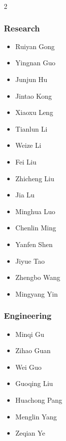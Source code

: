 \setlength{\parskip}{0pt} %
\setlength{\itemsep}{0pt} %
\setlength{\parsep}{0pt}  %
\begin{multicols}{2}
\raggedcolumns

\subsubsection*{Research}
\begin{itemize}
\item Ruiyan Gong
\item Yingnan Guo
\item Junjun Hu
\item Jintao Kong
\item Xiaoxu Leng
\item Tianlun Li
\item Weize Li
\item Fei Liu
\item Zhicheng Liu
\item Jia Lu
\item Minghua Luo
\item Chenlin Ming
\item Yanfen Shen
\item Jiyue Tao
\item Zhengbo Wang
\item Mingyang Yin
\end{itemize}

\subsubsection*{Engineering}
\begin{itemize}
\item Minqi Gu
\item Zihao Guan
\item Wei Guo
\item Guoqing Liu
\item Huachong Pang
\item Menglin Yang
\item Zeqian Ye


\end{itemize}
\end{multicols}
